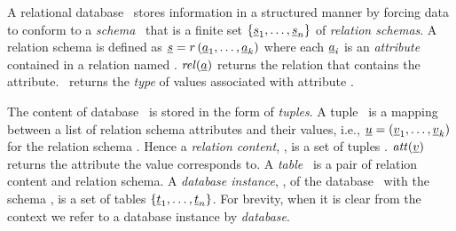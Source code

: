 A relational database \pDB\ stores information in a structured manner by forcing
data to conform to a \emph{schema} \pSch\ that is a finite set 
$\setDef {{\pRelSch}_1, \ldots, {\pRelSch}_n}$ of \emph{relation schemas}.
A relation schema is defined as
$\pRelSch = \vRel \paran {\vi \pAtt k}$ where each $\pAtt_i$ is an
\emph{attribute} contained in a relation named \vRel. 
$\getRel {\pAtt}$ returns the relation that contains the attribute.
\type [\pAtt]\ returns the \emph{type} of values associated with attribute \pAtt.

The content of database \pDB\ is stored in the form of \emph{tuples}. A tuple \pTuple\
is a mapping between a list of relation schema attributes and their values,
i.e.,
$\pTuple = \paran {\vi {\underline v} k}$ for the relation schema \vRel {}.
Hence a \emph{relation content}, \pRelCont, is a set of tuples \setDef {\vi \pTuple m}.
$\getAtt {\underline v}$ returns the attribute the value corresponds to.
A \emph{table} \pTab\ is a pair of relation content and relation schema.
A \emph{database instance}, \pInst, of the database \pDB\ with the
schema \pSch, is a set of tables $\setDef {\pTab_1, \ldots, \pTab_n}$.
For brevity, when it is clear from the context we refer to a database instance
by \emph{database}.


